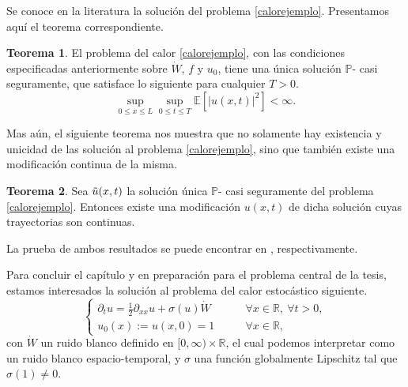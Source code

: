 \documentclass[letterpaper,twoside,12pt]{book}
\newcommand{\R}{\mathbb{R}}
\newcommand{\E}{\mathbb{E}}
\renewcommand{\P}{\mathbb{P}}
\newcommand{\1}{\mathds{1}}
\newcommand{\abs}[1]{\left\lvert #1 \right\rvert}
\renewcommand{\to}{\rightarrow}
\theoremstyle{definition}
\theoremstyle{definition}
\newtheorem{teo}{Teorema}
\theoremstyle{remark}
\theoremstyle{definition}
\theoremstyle{definition}
\theoremstyle{definition}
\theoremstyle{definition}
\theoremstyle{definition}
\begin{document}
Se conoce en la literatura la solución del problema \eqref{calorejemplo}. Presentamos aquí el teorema correspondiente.

\begin{teo} 
El problema del calor \eqref{calorejemplo}, con las condiciones especificadas anteriormente sobre $\dot W$, $f$ y $u_0$, tiene una única solución $\P$- casi seguramente, que satisface lo siguiente para cualquier $T>0$.
\[
\sup_{0\leq x\leq L}\sup_{0\leq t \leq T}\E\left[\abs{u(x,t)}^2\right]<\infty.   
\]
\end{teo}
Mas aún, el siguiente teorema nos muestra que no solamente hay existencia y unicidad de las solución al problema \eqref{calorejemplo}, sino que también existe una modificación continua de la misma.

\begin{teo} 
Sea $\Tilde{u}(x,t)$ la solución única $\P$- casi seguramente del problema \eqref{calorejemplo}. Entonces existe una modificación $u(x,t)$ de dicha solución cuyas trayectorias son continuas.
\end{teo}
La prueba de ambos resultados se puede encontrar en \cite[teorema 6.4, teorema 6.7]{Khoshnevisan2009}, respectivamente.

Para concluir el capítulo y en preparación para el problema central de la tesis, estamos interesados la solución al problema del calor estocástico siguiente.
\begin{equation}\label{shedefinitiva}
   \begin{cases}
      \partial_t u=\frac{1}{2}\partial_{xx}u+\sigma(u)\dot{W} & \qquad \forall x\in \R, \ \forall t>0,\\
      u_0(x):=u(x,0)=1 & \qquad \forall x\in \R,
   \end{cases}
\end{equation}
con $\dot{W}$ un ruido blanco definido en $[0,\infty)\times\R$, el cual podemos interpretar como un ruido blanco espacio-temporal, y $\sigma$ una función globalmente Lipschitz tal que $\sigma(1)\neq 0$.
\end{document}
